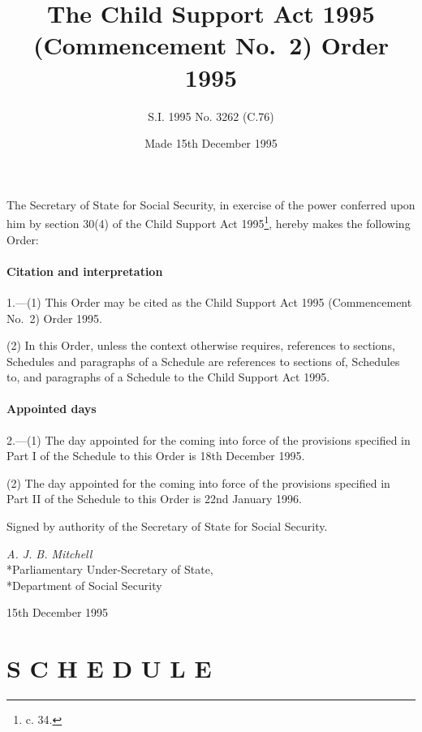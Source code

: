 \documentclass[a4paper]{article}
\title{The Child Support Act 1995 (Commencement No.\ 2) Order 1995}
\author{S.I. 1995 No. 3262 (C.76)}
\date{Made 15th December 1995%
}
\begin{document}
\maketitle

\noindent
The Secretary of State for Social Security, in exercise of the power conferred upon him by section 30(4) of the Child Support Act 1995\footnote{ c. 34.}, hereby makes the following Order:

{\sloppy

\tableofcontents

}

\setcounter{secnumdepth}{-2}

\subsection[1. Citation and interpretation]{Citation and interpretation}

1.—(1) This Order may be cited as the Child Support Act 1995 (Commencement No.\ 2) Order 1995.

(2) In this Order, unless the context otherwise requires, references to sections, Schedules and paragraphs of a Schedule are references to sections of, Schedules to, and paragraphs of a Schedule to the Child Support Act 1995.

\subsection[2. Appointed days]{Appointed days}

2.—(1) The day appointed for the coming into force of the provisions specified in Part I of the Schedule to this Order is 18th December 1995.

(2) The day appointed for the coming into force of the provisions specified in Part II of the Schedule to this Order is 22nd January 1996.

\bigskip

Signed by authority of the Secretary of State for Social Security.

{\raggedleft
\emph{A. J. B. Mitchell}\\*Parliamentary Under-Secretary of State,\\*Department of Social Security

}

15th December 1995

\clearpage

\part[Schedule]{S C H E D U L E}
\end{document}
